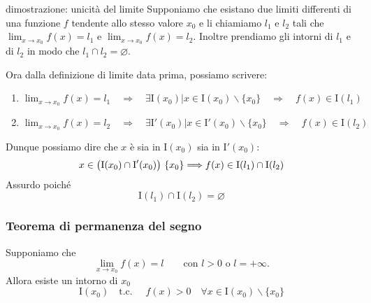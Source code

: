 \documentclass[x11names]{article}
\begin{document}
\begin{es}{dimostrazione: unicità del limite} 
Supponiamo che esistano due limiti differenti di una funzione $f$ tendente allo stesso valore $x_0$ e li chiamiamo $l_1$ e $l_2$ tali che $\lim_{x\to x_0}f\left(x\right) = l_1$ e $\lim_{ x\to x_0}f\left(x\right) = l_2$. Inoltre prendiamo gli intorni di  $l_1$ e di $l_2$ in modo che $l_1 \cap l_2 = \varnothing$.
	
\begin{center}

\end{center}


Ora dalla definizione di limite data prima, possiamo scrivere:
\begin{enumerate}
	\item $\lim_{x\to x_0}f\left(x\right) = l_1 \quad \Rightarrow \quad  \exists \text{I}\left(x_0\right) | x \in \text{I}\left(x_0\right) \backslash \{x_0\} \quad \Rightarrow \quad f\left(x\right) \in \text{I}\left(l_1\right)$
	\item $\lim_{x\to x_0}f\left(x\right) = l_2 \quad \Rightarrow \quad  \exists \text{I}'\left(x_0\right) | x \in \text{I}'\left(x_0\right) \backslash \{x_0\} \quad \Rightarrow \quad f\left(x\right) \in \text{I}\left(l_2\right)$
\end{enumerate}
Dunque possiamo dire che $x$ è sia in $\text{I}(x_0)$ sia in $\text{I}'(x_0)$:
\[
x \in \left(\text{I}(x_0) \cap \text{I}'(x_0)\right)\\ \left\{x_0\right\} \Longrightarrow f(x) \in \text{I}(l_1) \cap \text{I}(l_2)
\]
Assurdo poiché
\[
\text{I}(l_1) \cap \text{I}(l_2) = \varnothing
\]
\end{es}


\begin{center}
\colorbox{myred}{\begin{minipage}{5.75in}
\begin{redes}{}
\subsubsection{Teorema di permanenza del segno}
Supponiamo che 
\[
\lim_{x \to x_0}f(x) = l \qquad \text{con } l>0 \text{ o } l = +\infty.
\]
Allora esiste un intorno di $x_0$
\[
\text{I}(x_0) \quad \text{t.c. } \quad f(x) > 0 \quad \forall x \in \text{I}(x_0) \backslash \{x_0\}
\]
\end{redes}
\end{minipage}}        
\end{center}
\end{document}

